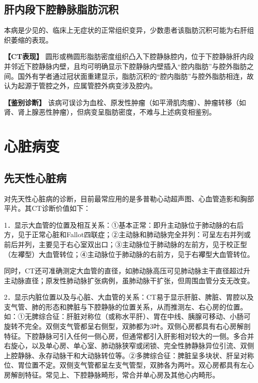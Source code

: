 \subsection{肝内段下腔静脉脂肪沉积}

本病是少见的、临床上无症状的正常组织变异，少数患者该脂肪沉积可能为右肝组织萎缩的表现。

\textbf{【CT表现】}
圆形或椭圆形脂肪密度组织凸入下腔静脉腔内，位于下腔静脉肝内段并邻近下腔静脉内壁，且均可明确显示下腔静脉内壁插入“腔内脂肪”与腔外脂肪之间。国外有学者通过冠状面重建显示，脂肪沉积的“腔内脂肪”与腔外脂肪相连，故认为起源于管腔之外，应属管腔外病变涉及腔内。

\textbf{【鉴别诊断】}
该病可误诊为血栓、原发性肿瘤（如平滑肌肉瘤）、肿瘤转移（如肾、肾上腺恶性肿瘤），但病变呈脂肪密度，不难与上述病变相鉴别。

\section{心脏病变}

\subsection{先天性心脏病}

对先天性心脏病的诊断，目前最常应用的是多普勒心动超声图、心血管造影和胸部平片。其CT诊断价值如下：

1．显示大血管的位置及相互关系：①基本正常：即升主动脉位于肺动脉的右后方，见于正常心脏和Fallot四联症；②主动脉和肺动脉完全并列：可呈左右并列或前后并列，主要见于右心室双出口；③主动脉位于肺动脉的左前方，见于校正型（左襻型）大血管转位；④主动脉位于肺动脉的右前方，见于右襻型大血管转位。

同时，CT还可准确测定大血管的直径，如肺动脉高压可见肺动脉主干直径超过升主动脉直径；原发性肺动脉扩张病例，虽肺动脉干扩张，但周围血管分支无改变。

2．显示内脏位置以及与心脏、大血管的关系：CT易于显示肝脏、脾脏、胃腔以及支气管、肺的形态和脾脏与下腔静脉的位置关系，从而推测左、右心房的位置。如：①无脾综合征：肝脏对称位（或称水平肝）、胃在中线、胰腺可移动、小肠可旋转不完全。双侧支气管都呈右侧型，双肺都为3叶。双侧心房都具有右心房解剖特征。下腔静脉可引入任何一侧心房，但通常都引入肝影相对较大的一侧。多合并右旋心，以及单心房、单心室、肺动脉狭窄或闭锁、完全性肺静脉异位引流、双侧上腔静脉、永存动脉干和大动脉转位等。②多脾综合征：脾脏呈多块状、肝呈对称位、胃位置不定。双侧支气管都呈左支气管型，双肺各为两叶。双心房都具有左心房解剖特征。常见上、下腔静脉畸形，常合并单心房及其他心内畸形。

